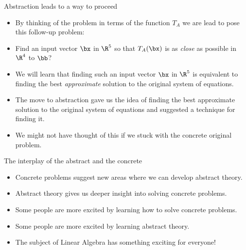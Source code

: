 \documentclass{beamer}
\begin{document}
\begin{frame} {Abstraction leads to a way to proceed}
\begin{itemize}
\item By thinking of the problem in terms of the function $T_A$ we are lead
to pose this follow-up problem:
\item Find an input vector $\bx$ in $\R^5$ so that $T_A(\bx)$ is as \emph{close} as possible
in $\R^4$ to $\bb$?
\item We will learn that finding such an input vector $\bx$ in $\R^5$ is equivalent to finding the
best \emph{approximate} solution to the original system of equations.
\item The move to abstraction gave us the idea of finding the best approximate solution to the
original system of equations and suggested a technique for finding it.
\item We might not have thought of this if we stuck with the concrete original problem.
\end{itemize}
\end{frame}

\begin{frame}{The interplay of the abstract and the concrete}
\begin{itemize}
\item Concrete problems suggest new areas where we can develop abstract theory.
\item Abstract theory gives us deeper insight into solving concrete problems.
\item Some people are more excited by learning how to solve concrete problems.
\item Some people are more excited by learning abstract theory.
\item The subject of Linear Algebra has something exciting for everyone!
\end{itemize}
\end{frame}
\end{document}
